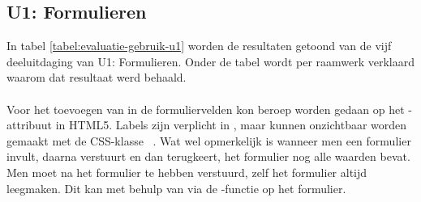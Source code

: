 
\subsection{U1: Formulieren}
In tabel \ref{tabel:evaluatie-gebruik-u1} worden de resultaten getoond van de vijf deeluitdaging van U1: Formulieren.
Onder de tabel wordt per raamwerk verklaard waarom dat resultaat werd behaald.

\begin{table}[H]
\centering
{}
\caption{Gebruik voor U1: Formulieren}
\label{tabel:evaluatie-gebruik-u1}
\end{table}


\paragraph{\jqm} 
Voor het toevoegen van  in de formuliervelden kon beroep worden gedaan op het -attribuut in HTML5. 
Labels zijn verplicht in \jqm{}, maar kunnen onzichtbaar worden gemaakt met de CSS-klasse ~\cite{JQuery2013}. 
Wat wel opmerkelijk is wanneer men een formulier invult, daarna verstuurt en dan terugkeert, het formulier nog alle waarden bevat. 
Men moet na het formulier te hebben verstuurd, zelf het formulier altijd leegmaken. 
Dit kan met behulp van \js{} via de -functie op het formulier.
 
